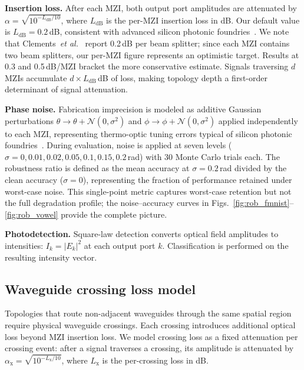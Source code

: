 \documentclass[11pt,a4paper]{article}
\begin{document}
\textbf{Insertion loss.}
After each MZI, both output port amplitudes are attenuated by
$\alpha = \sqrt{10^{-L_{\mathrm{dB}}/10}}$, where $L_{\mathrm{dB}}$ is the per-MZI
insertion loss in dB.  Our default value is $L_{\mathrm{dB}} = 0.2$\,dB, consistent
with advanced silicon photonic foundries~\cite{shafiee2024}.  We note that
Clements~\textit{et al.}~\cite{clements2016} report 0.2\,dB per beam splitter; since
each MZI contains two beam splitters, our per-MZI figure represents an optimistic
target.  Results at 0.3 and 0.5\,dB/MZI bracket the more conservative estimate.
Signals traversing $d$ MZIs accumulate $d \times L_{\mathrm{dB}}$\,dB of loss, making
topology depth a first-order determinant of signal attenuation.

\textbf{Phase noise.}
Fabrication imprecision is modeled as additive Gaussian perturbations
$\theta \to \theta + \mathcal{N}(0,\sigma^2)$ and
$\phi \to \phi + \mathcal{N}(0,\sigma^2)$ applied independently to each MZI,
representing thermo-optic tuning errors typical of silicon photonic
foundries~\cite{bandyopadhyay2021}.  During evaluation, noise is applied at seven
levels ($\sigma = 0, 0.01, 0.02, 0.05, 0.1, 0.15, 0.2$\,rad) with 30 Monte Carlo
trials each.  The robustness ratio is defined as the mean accuracy at
$\sigma{=}0.2$\,rad divided by the clean accuracy ($\sigma{=}0$), representing the
fraction of performance retained under worst-case noise.
This single-point metric captures worst-case retention but not the full degradation
profile; the noise--accuracy curves in Figs.~\ref{fig:rob_fmnist}--\ref{fig:rob_vowel}
provide the complete picture.

\textbf{Photodetection.}
Square-law detection converts optical field amplitudes to intensities: $I_k = |E_k|^2$
at each output port $k$.  Classification is performed on the resulting intensity vector.


\subsection{Waveguide crossing loss model}
\label{sec:crossing}

Topologies that route non-adjacent waveguides through the same spatial region require
physical waveguide crossings.  Each crossing introduces additional optical loss beyond
MZI insertion loss.  We model crossing loss as a fixed attenuation per crossing event:
after a signal traverses a crossing, its amplitude is attenuated by
$\alpha_{\mathrm{x}} = \sqrt{10^{-L_{\mathrm{x}}/10}}$, where
$L_{\mathrm{x}}$ is the per-crossing loss in dB.
\end{document}
